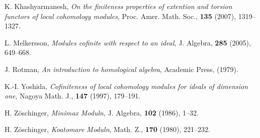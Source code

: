 \documentclass[10pt]{amsart}
\begin{document}
\begin{thebibliography}{9}
K. Khashyarmanesh, \emph{On the finiteness properties of
extention and torsion functors of local cohomology modules}, Proc.
Amer. Math. Soc., \textbf{135} (2007), 1319--1327.


L. Melkersson, {\it Modules cofinite with respect to an ideal}, J.
Algebra, {\bf 285} (2005), 649--668.


J. Rotman, \emph{An introduction to homological algebra}, Academic
Press, (1979).


K.-I. Yoshida, \emph{Cofiniteness of local cohomology modules for
ideals of dimension one}, Nagoya Math. J., \textbf{147} (1997),
179--191.


H. Z\"{o}schinger, \emph{Minimax Moduln}, J. Algebra, \textbf{102}
(1986), 1--32.


 H. Z\"{o}schinger, \emph{Koatomare Moduln}, Math. Z., \textbf{170} (1980),
221--232.
\end{thebibliography}


\end{document}
